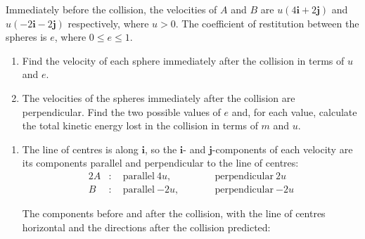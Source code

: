 \documentclass[leqno]{article}
\begin{document}
\begin{enumerate}[
  label=\textbf{\arabic*.},
  leftmargin=*,
  topsep=0pt,
  partopsep=0pt,
  parsep=0pt
]
Immediately before the collision, the velocities of $A$ and $B$ are $u(4\mathbf{i}+2\mathbf{j})$ and $u(-2\mathbf{i}-2\mathbf{j})$ respectively, where $u>0$. The coefficient of restitution between the spheres is $e$, where $0\leq e\leq1$. \\
\begin{enumerate}[label=\textbf{(\alph*)}]
\item Find the velocity of each sphere immediately after the collision in terms of $u$ and $e$.  \\
\item The velocities of the spheres immediately after the collision are perpendicular. Find the two possible values of $e$ and, for each value, calculate the total kinetic energy lost in the collision in terms of $m$ and $u$.  \\
\end{enumerate}

\vspace*{10pt}

\begin{djsSolution}
\begin{enumerate}[label=\textbf{(\alph*)}, start=1]
\item The line of centres is along \(\mathbf{i}\), so the \(\mathbf{i}\)- and \(\mathbf{j}\)-components of each velocity are its components parallel and perpendicular to the line of centres:
\begin{alignat*}{2}
A&:\quad\text{parallel}\ 4u,&\qquad&\text{perpendicular}\ 2u\\
B&:\quad\text{parallel}\ {-2u},&&\text{perpendicular}\ {-2u}
\end{alignat*}

The components before and after the collision, with the line of centres horizontal and the directions after the collision predicted:\par\nopagebreak


\end{enumerate}
\end{djsSolution}
\end{enumerate}
\end{document}
